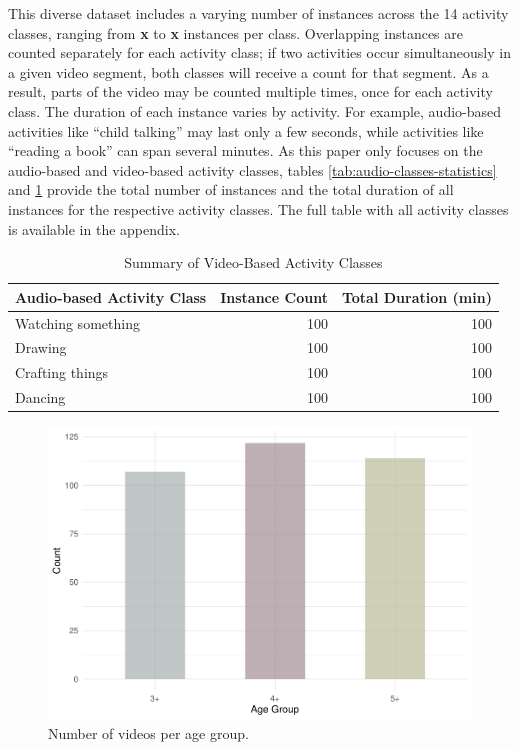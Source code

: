 \documentclass[
  man,floatsintext]{apa6}
\begin{document}
This diverse dataset includes a varying number of instances across the 14 activity classes, ranging from \textbf{x} to \textbf{x} instances per class. Overlapping instances are counted separately for each activity class; if two activities occur simultaneously in a given video segment, both classes will receive a count for that segment. As a result, parts of the video may be counted multiple times, once for each activity class. The duration of each instance varies by activity. For example, audio-based activities like ``child talking'' may last only a few seconds, while activities like ``reading a book'' can span several minutes. As this paper only focuses on the audio-based and video-based activity classes, tables \ref{tab:audio-classes-statistics} and \ref{tab:video-classes-statistics} provide the total number of instances and the total duration of all instances for the respective activity classes. The full table with all activity classes is available in the appendix.

\begin{longtable}[t]{lrr}
\caption{\label{tab:video-classes-statistics}\label{tab:video-classes-statistics}Summary of Video-Based Activity Classes}\\
\toprule
\textbf{Audio-based Activity Class} & \textbf{Instance Count} & \textbf{Total Duration (min)}\\
\midrule
Watching something & 100 & 100\\
Drawing & 100 & 100\\
Crafting things & 100 & 100\\
Dancing & 100 & 100\\
\bottomrule
\end{longtable}

\begin{figure}
\centering
\includegraphics{ChildLens_paper_files/figure-latex/age-distribution-1.pdf}
\caption{\label{fig:age-distribution}Number of videos per age group.}
\end{figure}
\end{document}
